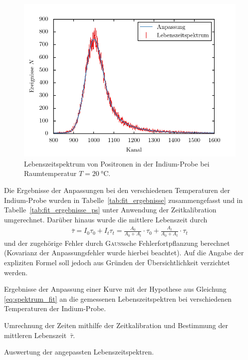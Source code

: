 \documentclass[11pt, a4paper]{article}
\numberwithin{equation}{section}
\begin{document}
\begin{figure}[h]
	\centering
	\includegraphics{./figures/lifetimes/raumtemperatur.pdf}
	\caption{Lebenszeitspektrum von Positronen in der Indium-Probe bei Raumtemperatur $T = \SI{20}{\degreeCelsius}$.}
	\label{fig:fit_lebenszeitspektrum}
\end{figure}
Die Ergebnisse der Anpassungen bei den verschiedenen Temperaturen der Indium-Probe wurden in Tabelle~\ref{tab:fit_ergebnisse} zusammengefasst und in Tabelle~\ref{tab:fit_ergebnisse_ps} unter Anwendung der Zeitkalibration umgerechnet.
Darüber hinaus wurde die mittlere Lebenszeit durch
\begin{align*}
	\bar{\tau} = I_0 \tau_0 + I_t \tau_t = \frac{A_0}{A_0 + A_t} \cdot \tau_0 + \frac{A_t}{A_0 + A_t} \cdot \tau_t
\end{align*}
\cite{add_infos} und der zugehörige Fehler durch \textsc{Gauß}sche Fehlerfortpflanzung berechnet (Kovarianz der Anpassungsfehler wurde hierbei beachtet).
Auf die Angabe der expliziten Formel soll jedoch aus Gründen der Übersichtlichkeit verzichtet werden.
\begin{table}
	\begin{subtable}{\textwidth}
		\centering
		\resizebox{\textwidth}{!}{
			
		}
		\caption{Ergebnisse der Anpassung einer Kurve mit der Hypothese aus Gleichung \eqref{eq:spektrum_fit} an die gemessenen Lebenszeitspektren bei verschiedenen Temperaturen der Indium-Probe.}
		\label{tab:fit_ergebnisse}
		\vspace*{0.8cm}
	\end{subtable}
	\begin{subtable}{\textwidth}
		\centering
		
		\caption{Umrechnung der Zeiten mithilfe der Zeitkalibration und Bestimmung der mittleren Lebenszeit~$\bar{\tau}$.}
		\label{tab:fit_ergebnisse_ps}
		\vspace*{0.5cm}
	\end{subtable}
	\caption{Auswertung der angepassten Lebenszeitspektren.}
\end{table}
\end{document}
